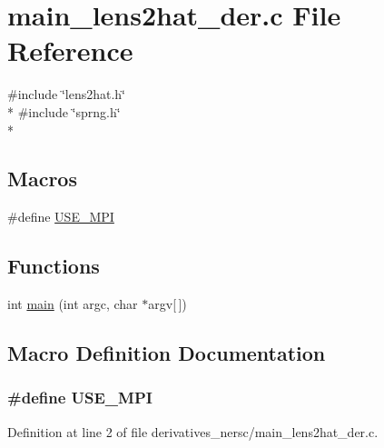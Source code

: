 \section{main\-\_\-lens2hat\-\_\-der.\-c File Reference}
\label{derivatives__nersc_2main__lens2hat__der_8c}
{\ttfamily \#include \char`\"{}lens2hat.\-h\char`\"{}}\\*
{\ttfamily \#include \char`\"{}sprng.\-h\char`\"{}}\\*
\subsection*{Macros}
\begin{DoxyCompactItemize}
\item 
\#define \hyperlink{derivatives__nersc_2main__lens2hat__der_8c_a3869d282031f6ea6b50fdb980b758420}{U\-S\-E\-\_\-\-M\-P\-I}
\end{DoxyCompactItemize}
\subsection*{Functions}
\begin{DoxyCompactItemize}
\item 
int \hyperlink{derivatives__nersc_2main__lens2hat__der_8c_a0ddf1224851353fc92bfbff6f499fa97}{main} (int argc, char $\ast$argv\mbox{[}$\,$\mbox{]})
\end{DoxyCompactItemize}


\subsection{Macro Definition Documentation}
\subsubsection[{U\-S\-E\-\_\-\-M\-P\-I}]{\setlength{\rightskip}{0pt plus 5cm}\#define U\-S\-E\-\_\-\-M\-P\-I}\label{derivatives__nersc_2main__lens2hat__der_8c_a3869d282031f6ea6b50fdb980b758420}


Definition at line 2 of file derivatives\-\_\-nersc/main\-\_\-lens2hat\-\_\-der.\-c.



